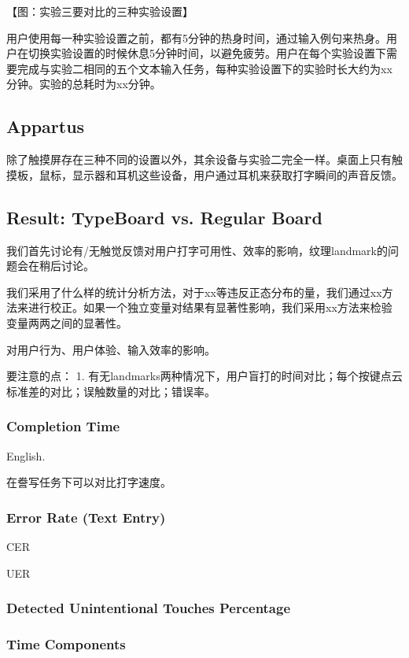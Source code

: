 【图：实验三要对比的三种实验设置】

用户使用每一种实验设置之前，都有5分钟的热身时间，通过输入例句来热身。用户在切换实验设置的时候休息5分钟时间，以避免疲劳。用户在每个实验设置下需要完成与实验二相同的五个文本输入任务，每种实验设置下的实验时长大约为xx分钟。实验的总耗时为xx分钟。

\subsection{Appartus}

除了触摸屏存在三种不同的设置以外，其余设备与实验二完全一样。桌面上只有触摸板，鼠标，显示器和耳机这些设备，用户通过耳机来获取打字瞬间的声音反馈。

\subsection{Result: TypeBoard vs. Regular Board}

我们首先讨论有/无触觉反馈对用户打字可用性、效率的影响，纹理landmark的问题会在稍后讨论。

我们采用了什么样的统计分析方法，对于xx等违反正态分布的量，我们通过xx方法来进行校正。如果一个独立变量对结果有显著性影响，我们采用xx方法来检验变量两两之间的显著性。

对用户行为、用户体验、输入效率的影响。

要注意的点：
1. 有无landmarks两种情况下，用户盲打的时间对比；每个按键点云标准差的对比；误触数量的对比；错误率。

\subsubsection{Completion Time}

English.

在誊写任务下可以对比打字速度。

\subsubsection{Error Rate (Text Entry)}

CER

UER

\subsubsection{Detected Unintentional Touches Percentage}

\subsubsection{Time Components}

